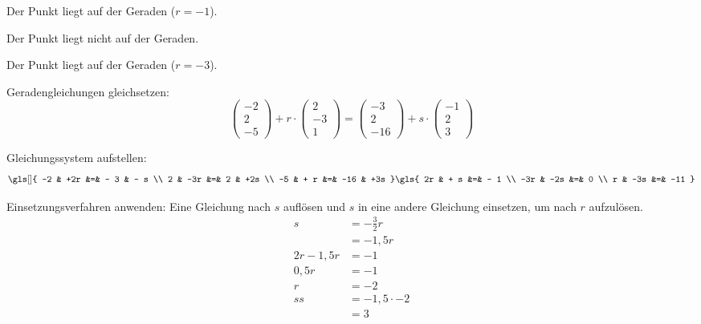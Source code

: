 \documentclass[11pt, a5paper, landscape]{scrartcl}
\begin{document}
	\begin{loesung}
		\begin{enumeratea}
			\item Der Punkt liegt auf der Geraden ($r = -1$).
			\item Der Punkt liegt nicht auf der Geraden.
			\item Der Punkt liegt auf der Geraden ($r = -3$).
		\end{enumeratea}
		\begin{enumeratea}
			\item Geradengleichungen gleichsetzen:
			\[ \begin{pmatrix} -2 \\ 2 \\ -5 \end{pmatrix} + r\cdot \begin{pmatrix} 2 \\ -3 \\ 1 \end{pmatrix} = \begin{pmatrix} -3 \\ 2 \\ -16 \end{pmatrix} + s\cdot \begin{pmatrix} -1 \\ 2 \\ 3 \end{pmatrix} \]
			
			Gleichungssystem aufstellen:
			\begin{align*}
			\gls[]{
				-2 & +2r &=& - 3 & - s \\
				 2 & -3r &=&   2 & +2s \\
				-5 & + r &=& -16 & +3s
			}
			\gls{
				 2r & + s &=& - 1 \\
				-3r & -2s &=&   0 \\
				  r & -3s &=& -11
			}
			\end{align*}
			
			Einsetzungsverfahren anwenden: Eine Gleichung nach $s$ auflösen und $s$ in eine andere Gleichung einsetzen, um nach $r$ aufzulösen.
			\begin{align*}
				s &= -\tfrac{3}{2}r \\
				  &= -1,5r\\[1em]
				2r - 1,5r &= -1 \\
				0,5r &= -1\\
				r &= -2 \\[1em]s
				s &= -1,5\cdot -2\\
				  &= 3\\  
			\end{align*}
			

\end{enumeratea}
\end{loesung}
\end{document}
